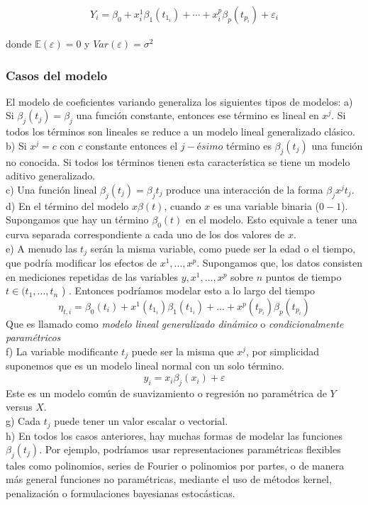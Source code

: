 \documentclass[
]{article}
\begin{document}
\begin{eqnarray}\label{modelo.normal}
Y_i=\beta_0+x_i^{1}\beta_1(t_{1_i})+\cdots+x_i^p\beta_p(t_{p_i})+\varepsilon_i
\end{eqnarray}

donde \(\mathbb{E}(\varepsilon)=0\) y \(Var(\varepsilon)=\sigma^2\)

\hypertarget{casos-del-modelo}{%
\subsubsection{Casos del modelo}\label{casos-del-modelo}}

El modelo de coeficientes variando generaliza los siguientes tipos de
modelos: a) Si \(\beta_j(t_j)=\beta_j\) una función constante, entonces
ese término es lineal en \(x^j\). Si todos los términos son lineales se
reduce a un modelo lineal generalizado clásico.\\
b) Si \(x^j=c\) con \(c\) constante entonces el \(j-ésimo\) término es
\(\beta_j(t_j)\) una función no conocida. Si todos los términos tienen
esta característica se tiene un modelo aditivo generalizado.\\
c) Una función lineal \(\beta_j(t_j)=\beta_jt_j\) produce una
interacción de la forma \(\beta_jx^jt_j\).\\
d) En el término del modelo \(x\beta(t)\), cuando \(x\) es una variable
binaria (\(0-1\)). Supongamos que hay un término \(\beta_0(t)\) en el
modelo. Esto equivale a tener una curva separada correspondiente a cada
uno de los dos valores de \(x\).\\
e) A menudo las \(t_j\) serán la misma variable, como puede ser la edad
o el tiempo, que podría modificar los efectos de \(x^1,...,x^p\).
Supongamos que, los datos consisten en mediciones repetidas de las
variables \(y, x^1 , ..., x^p\) sobre \(n\) puntos de tiempo
\(t\in(t_1,...,t_n\) ) . Entonces podríamos modelar esto a lo largo del
tiempo
\[\eta_{t,i} =\beta_0(t_i) +x^1 (t_{1_i})\beta_1(t_{1_i}) + ... +x^p (t_{p_i})\beta_p(t_{p_i})\]
Que es llamado como \emph{modelo lineal generalizado dinámico} o
\emph{condicionalmente paramétricos}\\
f) La variable modificante \(t_j\) puede ser la misma que \(x^j\), por
simplicidad suponemos que es un modelo lineal normal con un solo
término. \[y_i =x_i \beta_j(x_i) + \varepsilon\] Este es un modelo común
de suavizamiento o regresión no paramétrica de \(Y\) versus \(X\).\\
g) Cada \(t_j\) puede tener un valor escalar o vectorial.\\
h) En todos los casos anteriores, hay muchas formas de modelar las
funciones \(\beta_j(t_j)\). Por ejemplo, podríamos usar representaciones
paramétricas flexibles tales como polinomios, series de Fourier o
polinomios por partes, o de manera más general funciones no
paramétricas, mediante el uso de métodos kernel, penalización o
formulaciones bayesianas estocásticas.
\end{document}
